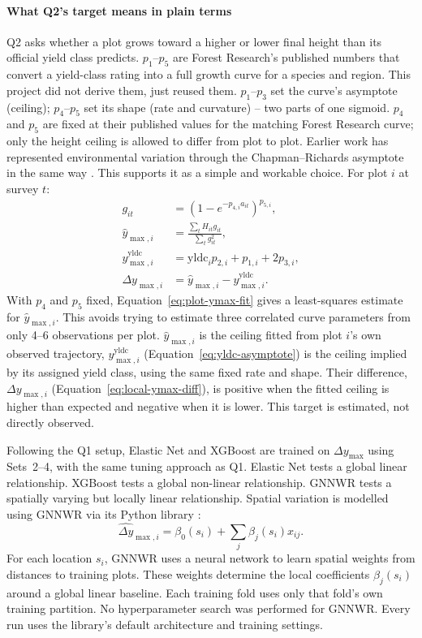 \documentclass[logo,msc,ai]{infthesis}           %
\begin{document}
\paragraph*{What Q2's target means in plain terms} Q2 asks whether a plot grows toward a higher or lower final height than its official yield class predicts. $p_1$--$p_5$ are Forest Research's published numbers that convert a yield-class rating into a full growth curve for a species and region. This project did not derive them, just reused them. $p_1$--$p_3$ set the curve's asymptote (ceiling); $p_4$--$p_5$ set its shape (rate and curvature) -- two parts of one sigmoid. $p_4$ and $p_5$ are fixed at their published values for the matching Forest Research curve; only the height ceiling is allowed to differ from plot to plot. Earlier work has represented environmental variation through the Chapman--Richards asymptote in the same way \cite{scolforo2013Dominant_C2_CR}. This supports it as a simple and workable choice. For plot $i$ at survey $t$:
\begin{align}
g_{it} &= \left(1-e^{-p_{4,i}a_{it}}\right)^{p_{5,i}}, \label{eq:git-curve} \\
\hat y_{\max,i} &= \frac{\sum_t H_{it}g_{it}}{\sum_t g_{it}^2}, \label{eq:plot-ymax-fit} \\
y_{\max,i}^{\mathrm{yldc}} &= \mathrm{yldc}_i p_{2,i}+p_{1,i}+2p_{3,i}, \label{eq:yldc-asymptote} \\
\Delta y_{\max,i} &= \hat y_{\max,i}-y_{\max,i}^{\mathrm{yldc}}. \label{eq:local-ymax-diff}
\end{align}
With $p_4$ and $p_5$ fixed, Equation~\eqref{eq:plot-ymax-fit} gives a least-squares estimate for $\hat y_{\max,i}$. This avoids trying to estimate three correlated curve parameters from only 4--6 observations per plot. $\hat y_{\max,i}$ is the ceiling fitted from plot $i$'s own observed trajectory, $y_{\max,i}^{\mathrm{yldc}}$ (Equation~\eqref{eq:yldc-asymptote}) is the ceiling implied by its assigned yield class, using the same fixed rate and shape. Their difference, $\Delta y_{\max,i}$ (Equation~\eqref{eq:local-ymax-diff}), is positive when the fitted ceiling is higher than expected and negative when it is lower. This target is estimated, not directly observed.

Following the Q1 setup, Elastic Net and XGBoost are trained on $\Delta y_{\max}$ using Sets~2--4, with the same tuning approach as Q1. Elastic Net tests a global linear relationship. XGBoost tests a global non-linear relationship. GNNWR tests a spatially varying but locally linear relationship. Spatial variation is modelled using GNNWR via its Python library \cite{du2020Geographically_C6_GWR, du2022PyGNNWR_C6_GWR}:
\begin{equation}
\widehat{\Delta y}_{\max,i} = \beta_0(s_i) + \sum_j \beta_j(s_i) x_{ij}.
\label{eq:gnnwr}
\end{equation}
For each location $s_i$, GNNWR uses a neural network to learn spatial weights from distances to training plots. These weights determine the local coefficients $\beta_j(s_i)$ around a global linear baseline. Each training fold uses only that fold's own training partition. No hyperparameter search was performed for GNNWR. Every run uses the library's default architecture and training settings.
\end{document}
